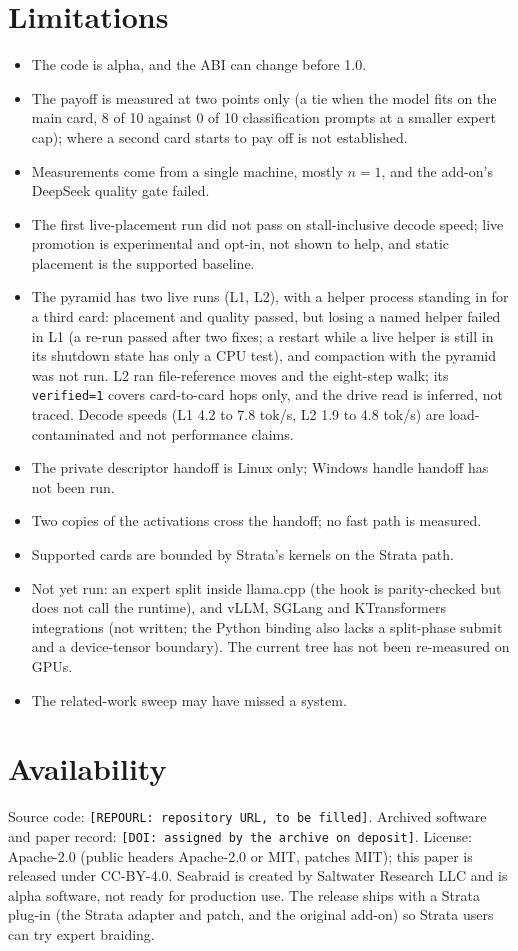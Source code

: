 \documentclass[11pt]{article}
\newcommand{\product}{Seabraid}                 %
\newcommand{\REPOURL}{\texttt{[REPOURL: repository URL, to be filled]}}
\newcommand{\DOI}{\texttt{[DOI: assigned by the archive on deposit]}}
\begin{document}
\section{Limitations}
\begin{itemize}
\item The code is alpha, and the ABI can change before 1.0.
\item The payoff is measured at two points only (a tie when the model fits on the main card, 8 of 10 against 0 of 10
classification prompts at a smaller expert cap); where a second card starts to pay off is not established.
\item Measurements come from a single machine, mostly $n=1$, and the add-on's DeepSeek quality gate failed.
\item The first live-placement run did not pass on stall-inclusive decode speed; live promotion is experimental and
opt-in, not shown to help, and static placement is the supported baseline.
\item The pyramid has two live runs (L1, L2), with a helper process standing in for a third card: placement and quality passed, but
losing a named helper failed in L1 (a re-run passed after two fixes; a restart while a live helper is still in its shutdown state has only a CPU test), and compaction with the pyramid was not run. L2 ran file-reference
moves and the eight-step walk; its \texttt{verified=1} covers card-to-card hops only, and the drive read is inferred, not traced. Decode
speeds (L1 4.2 to 7.8 tok/s, L2 1.9 to 4.8 tok/s) are load-contaminated and not performance claims.
\item The private descriptor handoff is Linux only; Windows handle handoff has not been run.
\item Two copies of the activations cross the handoff; no fast path is measured.
\item Supported cards are bounded by Strata's kernels on the Strata path.
\item Not yet run: an expert split inside llama.cpp (the hook is parity-checked but does not call the runtime),
and vLLM, SGLang and KTransformers integrations (not written; the Python binding also lacks a split-phase submit and a
device-tensor boundary). The current tree has not been re-measured on GPUs.
\item The related-work sweep may have missed a system.
\end{itemize}

\section{Availability}
Source code: \REPOURL. Archived software and paper record: \DOI. License: Apache-2.0 (public headers Apache-2.0 or MIT, patches MIT);
this paper is released under CC-BY-4.0. \product{} is created by Saltwater Research LLC and is alpha software, not
ready for production use. The release ships with a Strata plug-in (the Strata adapter and patch, and the original add-on) so
Strata users can try expert braiding.
\end{document}
